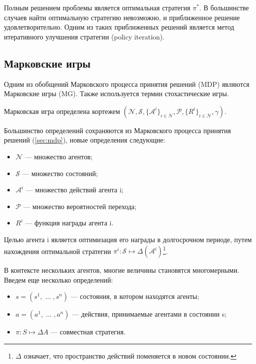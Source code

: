 Полным решением проблемы является оптимальная стратегия \(\pi^*\). В большинстве случаев найти оптимальную стратегию невозможно, и приближенное решение удовлетворительно. Одним из таких приближенных решений является метод итеративного улучшения стратегии (policy iteration).

\subsection{Марковские игры} \label{sec:markov-games}

Одним из обобщений Марковского процесса принятия решений (MDP) являются Марковские игры (MG).
Также используется термин стохастические игры.

Марковская игра определена кортежем \((\mathcal{N}, \mathcal{S}, \{\mathcal{A}^i\}_{i \in \mathcal{N}}, \mathcal{P}, \{R^i\}_{i \in \mathcal{N}}, \gamma)\).

Большинство определений сохраняются из Марковского процесса принятия решений (\ref{sec:mdp}), новые определения следующие:
\begin{itemize}[label=---]
	\item \(\mathcal{N}\) --- множество агентов;
	\item \(\mathcal{S}\) --- множество состояний;
	\item \(\mathcal{A}^i\) --- множество действий агента i;
	\item \(\mathcal{P}\) --- множество вероятностей перехода;
	\item \(R^i\) --- функция награды агента i.
\end{itemize}

Целью агента i является оптимизация его награды в долгосрочном периоде, путем нахождения оптимальной стратегии \(\pi^i: \mathcal{S} \mapsto \Delta (\mathcal{A}^i) \)\footnote{ \(\Delta\) означает, что пространство действий поменяется в новом состоянии.}.

В контексте нескольких агентов, многие величины становятся многомерными. Введем еще несколько определений:
\begin{itemize}[label=---]
	\item \(s = (s^1, \; \dots \;, s^n)\) --- состояния, в котором находятся агенты;
	\item \(a = (a^1, \; \dots \;, a^n)\) --- действия, принимаемые агентами в состоянии s;
	\item \( \pi : S \mapsto \Delta A \) --- совместная стратегия.
\end{itemize}

